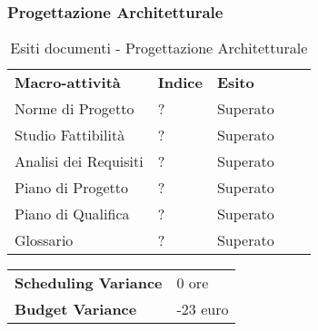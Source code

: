 \subsubsection{Progettazione Architetturale}
\begin{table}[!ht]
			\centering
				\begin{tabular}{|l|l|l|ll}
					\cline{1-3}
					 \textbf{Macro-attività}  & \textbf{Indice \glossaryItem{Gulpease}}  & \textbf{Esito}  &  \\ \cline{1-3}
					 Norme di Progetto  & ? & Superato &  \\ \cline{1-3}
					 Studio Fattibilità & ? & Superato &  \\ \cline{1-3}
					 Analisi dei Requisiti & ? & Superato &  \\ \cline{1-3}
					 Piano di Progetto & ? & Superato &  \\ \cline{1-3}
					 Piano di Qualifica & ? & Superato &  \\ \cline{1-3}
					 Glossario & ? & Superato &  \\ \cline{1-3}
				\end{tabular}
				\caption{Esiti  documenti - Progettazione Architetturale}
		\end{table}
		\begin{table}[!ht]
		\centering
		\begin{tabular}{l|l}
		\textbf{Scheduling Variance} & 0 ore \\
		\textbf{Budget Variance} & -23 euro \\
		\end{tabular}
		\end{table}

